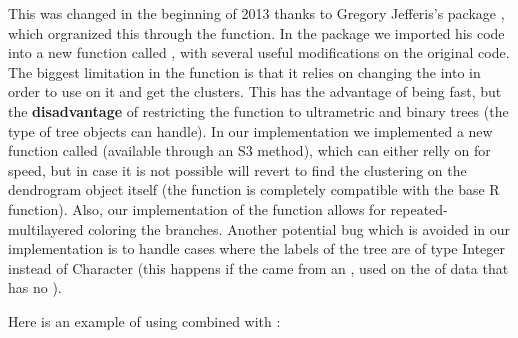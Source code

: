 \documentclass[shortnames,nojss,article]{jss}\usepackage[]{graphicx}\usepackage[]{color}
\begin{document}
This was changed in the beginning of 2013 thanks to Gregory Jefferis's  package \citep{CRAN:dendroextras}, which orgranized this through the  function. In the  package we imported his code into a new function called , with several useful modifications on the original code. The biggest limitation in the  function is that it relies on changing the  into  in order to use  on it and get the clusters. This has the advantage of being fast, but the \textbf{disadvantage} of restricting the function to ultrametric and binary trees (the type of tree  objects can handle). In our implementation we implemented a new function called  (available through an S3 method), which can either relly on  for speed, but in case it is not possible will revert to find the clustering on the dendrogram object itself (the function is completely compatible with the base R  function). Also, our implementation of the  function allows for repeated-multilayered coloring the branches. Another potential bug which is avoided in our implementation is to handle cases where the labels of the tree are of type Integer instead of Character (this happens if the  came from an , used on the  of data that has no ).

Here is an example of using  combined with :
\end{document}
